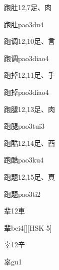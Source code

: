 \begin{Entry}{跑肚}{12,7}{⾜、⾁}
  \begin{Phonetics}{跑肚}{pao3du4}
  \end{Phonetics}
\end{Entry}

\begin{Entry}{跑调}{12,10}{⾜、⾔}
  \begin{Phonetics}{跑调}{pao3diao4}
  \end{Phonetics}
\end{Entry}

\begin{Entry}{跑掉}{12,11}{⾜、⼿}
  \begin{Phonetics}{跑掉}{pao3diao4}
  \end{Phonetics}
\end{Entry}

\begin{Entry}{跑腿}{12,13}{⾜、⾁}
  \begin{Phonetics}{跑腿}{pao3tui3}
  \end{Phonetics}
\end{Entry}

\begin{Entry}{跑酷}{12,14}{⾜、⾣}
  \begin{Phonetics}{跑酷}{pao3ku4}
  \end{Phonetics}
\end{Entry}

\begin{Entry}{跑题}{12,15}{⾜、⾴}
  \begin{Phonetics}{跑题}{pao3ti2}
  \end{Phonetics}
\end{Entry}

\begin{Entry}{辈}{12}{⾞}
  \begin{Phonetics}{辈}{bei4}[][HSK 5]
  \end{Phonetics}
\end{Entry}

\begin{Entry}{辜}{12}{⾟}
  \begin{Phonetics}{辜}{gu1}
  \end{Phonetics}
\end{Entry}

